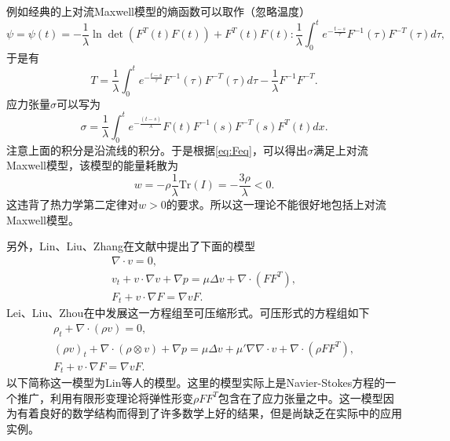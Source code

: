 例如经典的上对流Maxwell模型的熵函数可以取作（忽略温度）
\begin{equation*}
	\psi  = \psi(t) = - \frac{1}{\lambda}  \ln \det (F^T(t) F(t)) + F^T(t) F(t) : \frac{1}{\lambda}  \int_{0}^t e^{-\frac{t-s}{\tau}} F^{-1}(\tau) F^{-T}(\tau) d\tau,
\end{equation*}
于是有
\begin{equation*}
	T = \frac{1}{\lambda}  \int_{0}^t e^{-\frac{t-s}{\tau}} F^{-1}(\tau) F^{-T}(\tau) d\tau -\frac{1}{\lambda}  F^{-1} F^{-T} .
\end{equation*}
应力张量$\sigma$可以写为
\begin{equation*}
	\sigma = \frac{1}{\lambda} \int_{0}^{t} e^{-\frac{(t-s)}{\lambda} } F(t)  F^{-1}(s) F^{-T}(s) F^T(t)  dx.
\end{equation*}
注意上面的积分是沿流线的积分。于是根据\eqref{eq:Feq}，可以得出$\sigma$满足上对流Maxwell模型，该模型的能量耗散为
\begin{equation*}
	w = - \rho \frac{1}{\lambda} \mbox{Tr}(I) = -\frac{3\rho}{\lambda} < 0.
\end{equation*}
这违背了热力学第二定律对$w>0$的要求。所以这一理论不能很好地包括上对流Maxwell模型。


另外，Lin、Liu、Zhang在文献\cite{lin2005hydrodynamics}中提出了下面的模型
\begin{subequations}\label{eq:linincompressible}
	\begin{align}
		\nabla \cdot v = 0, \\
		v_t + v \cdot \nabla v + \nabla p = \mu \Delta v + \nabla \cdot( F F^T), \\
		F_t + v \cdot \nabla F = \nabla v F.
	\end{align}
\end{subequations}
Lei、Liu、Zhou在\cite{liu2008global}中发展这一方程组至可压缩形式。可压形式的方程组如下
\begin{subequations}\label{eq:lincompressible}
	\begin{align}
		\rho_t + \nabla \cdot (\rho v) = 0, \\
		(\rho v)_t + \nabla \cdot (\rho\otimes v) + \nabla p = \mu \Delta v + \mu' \nabla \nabla \cdot v+ \nabla \cdot( \rho F F^T), \\
		F_t + v \cdot \nabla F = \nabla v F.
	\end{align}
\end{subequations}
以下简称这一模型为Lin等人的模型。这里的模型实际上是Navier-Stokes方程的一个推广，利用有限形变理论将弹性形变$\rho F F^T$包含在了应力张量之中。这一模型因为有着良好的数学结构而得到了许多数学上好的结果\cite{lin2012some}，但是尚缺乏在实际中的应用实例。

